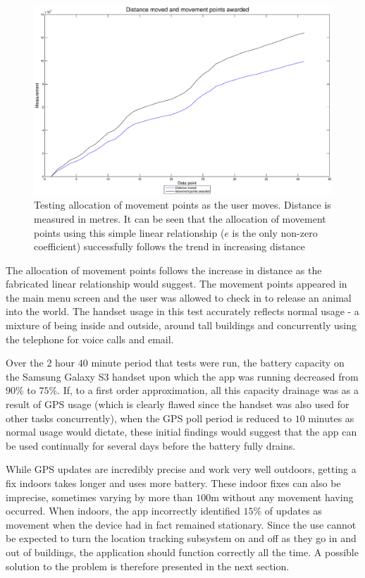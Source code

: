 \documentclass[12pt,a4paper,twoside]{article}
\begin{document}
\begin{figure}
\label{fig:gpstestresults}
\begin{center}
\includegraphics[scale=0.35]{mpoints.eps}
\end{center}
\caption{Testing allocation of movement points as the user moves. Distance is measured in metres. It can be seen that the allocation of movement points using this simple linear relationship ($e$ is the only non-zero coefficient) successfully follows the trend in increasing distance}
\end{figure}

The allocation of movement points follows the increase in distance as the fabricated linear relationship would suggest. The movement points appeared in the main menu screen and the user was allowed to check in to release an animal into the world. The handset usage in this test accurately reflects normal usage - a mixture of being inside and outside, around tall buildings and concurrently using the telephone for voice calls and email.

Over the $2$ hour $40$ minute period that tests were run, the battery capacity on the Samsung Galaxy S3 handset upon which the app was running decreased from $90$\% to $75$\%. If, to a first order approximation, all this capacity drainage was as a result of GPS usage (which is clearly flawed since the handset was also used for other tasks concurrently), when the GPS poll period is reduced to $10$ minutes as normal usage would dictate, these initial findings would suggest that the app can be used continually for several days before the battery fully drains.

While GPS updates are incredibly precise and work very well outdoors, getting a fix indoors takes longer and uses more battery. These indoor fixes can also be imprecise, sometimes varying by more than $100$m without any movement having occurred. When indoors, the app incorrectly identified $15$\% of updates as movement when the device had in fact remained stationary. Since the use cannot be expected to turn the location tracking subsystem on and off as they go in and out of buildings, the application should function correctly all the time. A possible solution to the problem is therefore presented in the next section.
\end{document}
